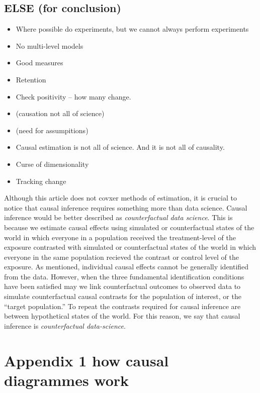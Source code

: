 \documentclass[
  singlecolumn]{report}
\providecommand{\tightlist}{%
  \setlength{\itemsep}{0pt}\setlength{\parskip}{0pt}}\usepackage{longtable,booktabs,array}
\begin{document}
\hypertarget{else-for-conclusion}{%
\subsection{ELSE (for conclusion)}\label{else-for-conclusion}}

\begin{itemize}
\tightlist
\item
  Where possible do experiments, but we cannot always perform
  experiments\\
\item
  No multi-level models
\item
  Good measures
\item
  Retention
\item
  Check positivity -- how many change.
\item
  (causation not all of science)
\item
  (need for assumpitions)
\item
  Causal estimation is not all of science. And it is not all of
  causality.
\item
  Curse of dimensionality
\item
  Tracking change
\end{itemize}

Although this article does not covxer methods of estimation, it is
crucial to notice that causal inference requires something more than
data science. Causal inference would be better described as
\emph{counterfactual data science}. This is because we estimate causal
effects using simulated or counterfactual states of the world in which
everyone in a population received the treatment-level of the exposure
contrasted with simulated or counterfactual states of the world in which
everyone in the same population recieved the contrast or control level
of the exposure. As mentioned, individual causal effects cannot be
generally identified from the data. However, when the three fundamental
identification conditions have been satisfied may we link counterfactual
outcomes to observed data to simulate counterfactual causal contrasts
for the population of interest, or the ``target population.'' To repeat
the contrasts required for causal inference are between hypothetical
states of the world. For this reason, we say that causal inference is
\emph{counterfactual data-science}.

\hypertarget{appendix-1-how-causal-diagrammes-work}{%
\section{Appendix 1 how causal diagrammes
work}\label{appendix-1-how-causal-diagrammes-work}}
\end{document}
